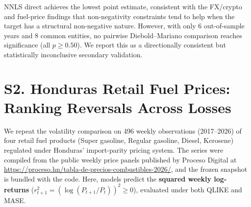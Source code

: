 \documentclass[aip,cha,reprint,amsmath,amssymb]{revtex4-2}
\begin{document}
NNLS direct achieves the lowest point estimate, consistent with the FX/crypto and fuel-price findings that non-negativity constraints tend to help when the target has a structural non-negative nature. However, with only 6 out-of-sample years and 8 common entities, no pairwise Diebold--Mariano comparison reaches significance (all $p \ge 0.50$). We report this as a directionally consistent but statistically inconclusive secondary validation.

\section{S2. Honduras Retail Fuel Prices: Ranking Reversals Across Losses}
\label{sec:fuel}

We repeat the volatility comparison on 496 weekly observations (2017--2026) of four retail fuel products (Super gasoline, Regular gasoline, Diesel, Kerosene) regulated under Honduras' import-parity pricing system. The series were compiled from the public weekly price panels published by Proceso Digital at \url{https://proceso.hn/tabla-de-precios-combustibles-2026/}, and the frozen snapshot is bundled with the code. Here, models predict the \textbf{squared weekly log-returns} ($r_{t+1}^2 = (\log(P_{t+1}/P_t))^2 \ge 0$), evaluated under both QLIKE and MASE.
\end{document}
